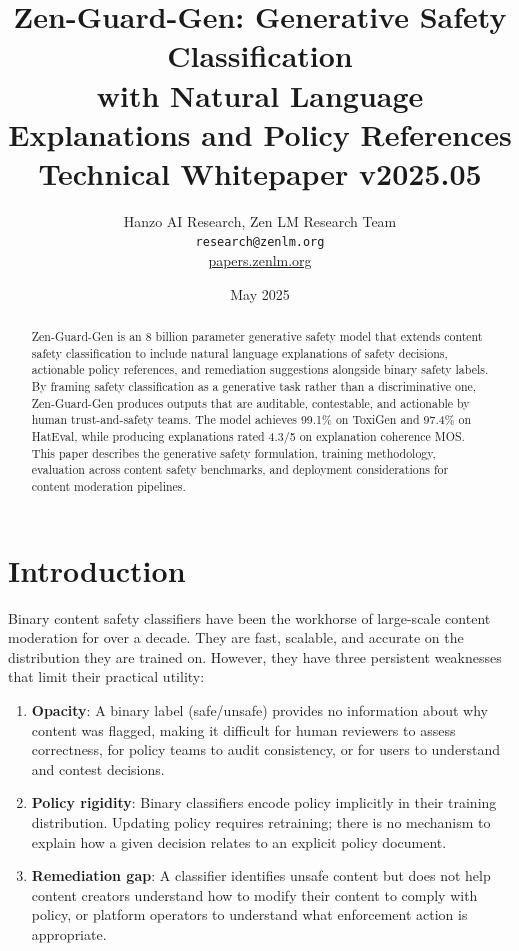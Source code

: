 \documentclass[11pt,a4paper]{article}
\title{\textbf{Zen-Guard-Gen: Generative Safety Classification\\
with Natural Language Explanations and Policy References}\\[0.5em]
\large Technical Whitepaper v2025.05}
\author{Hanzo AI Research, Zen LM Research Team\\
\texttt{research@zenlm.org}\\
\href{https://papers.zenlm.org}{papers.zenlm.org}}
\date{May 2025}
\begin{document}
\maketitle

\begin{abstract}
Zen-Guard-Gen is an 8 billion parameter generative safety model that extends content safety classification to include natural language explanations of safety decisions, actionable policy references, and remediation suggestions alongside binary safety labels. By framing safety classification as a generative task rather than a discriminative one, Zen-Guard-Gen produces outputs that are auditable, contestable, and actionable by human trust-and-safety teams. The model achieves 99.1\% on ToxiGen and 97.4\% on HatEval, while producing explanations rated 4.3/5 on explanation coherence MOS. This paper describes the generative safety formulation, training methodology, evaluation across content safety benchmarks, and deployment considerations for content moderation pipelines.
\end{abstract}

\tableofcontents
\newpage

\section{Introduction}

Binary content safety classifiers have been the workhorse of large-scale content moderation for over a decade. They are fast, scalable, and accurate on the distribution they are trained on. However, they have three persistent weaknesses that limit their practical utility:

\begin{enumerate}
  \item \textbf{Opacity}: A binary label (safe/unsafe) provides no information about why content was flagged, making it difficult for human reviewers to assess correctness, for policy teams to audit consistency, or for users to understand and contest decisions.
  \item \textbf{Policy rigidity}: Binary classifiers encode policy implicitly in their training distribution. Updating policy requires retraining; there is no mechanism to explain how a given decision relates to an explicit policy document.
  \item \textbf{Remediation gap}: A classifier identifies unsafe content but does not help content creators understand how to modify their content to comply with policy, or platform operators to understand what enforcement action is appropriate.
\end{enumerate}
\end{document}
